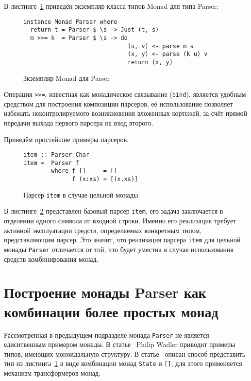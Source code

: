 В листинге~\ref{listing:MonadParser} приведён экземпляр класса типов Monad для 
типа Parser:

\begin{figure}[t]
  \begin{lstlisting}
instance Monad Parser where
  return t = Parser $ \s -> Just (t, s)
  m >>= k  = Parser $ \s -> do
                              (u, v) <- parse m s
                              (x, y) <- parse (k u) v
                              return (x, y)
  \end{lstlisting}
  \caption{Зкземпляр Monad для Parser}
  \label{listing:MonadParser}
\end{figure}

Операция \lstinline{>>=}, известная как монадическое связывание 
(\lstinline{bind}), является удобным средством для построения композиции 
парсеров, её использование позволяет избежать неконтролируемого возникновения
вложенных кортежей, за счёт прямой передачи выхода первого парсера на вход
второго.

Приведём простейшие примеры парсеров.

\begin{figure}[h]
  \begin{lstlisting}
item :: Parser Char
item =  Parser f
        where f []     = []
              f (x:xs) = [(x,xs)]
  \end{lstlisting}
  \caption{Парсер \lstinline{item} в случае цельной монады}
  \label{listing:ParserItem}
\end{figure}

В листинге~\ref{listing:ParserItem} представлен базовый парсер \lstinline{item},
его задача заключается в отделении одного символа от входной строки. Именно его
реализация требует активной эксплуатации средств, определяемых конкретным типом,
представляющим парсер. Это значит, что реализация парсера \lstinline{item} для
цельной монады \lstinline{Parser} отличается от той, что будет уместна в случае
использования средств комбинирования монад.

\section{Построение монады Parser как комбинации более простых монад}

Рассмотренная в предыдущем подразделе монада \lstinline{Parser} не является
едиснтвенным примером монады. В статье~\autocite{WadlerMonads} Philip Wadler
приводит примеры типов, имеющих моноидальную структуру.
В статье~\autocite{MonParsing} описан способ представить тип из
листинга~\ref{listing:MonadParser} в виде комбинации монад \lstinline{State}
и \lstinline{[]}, для этого применяется механизм трансформеров монад.

